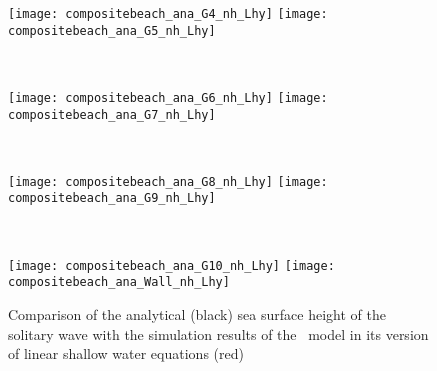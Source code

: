 \begin{figure}[htbp]
\begin{minipage}{\textwidth}
\texttt{[image: compositebeach\_ana\_G4\_nh\_Lhy]}
\texttt{[image: compositebeach\_ana\_G5\_nh\_Lhy]}
\end{minipage} \\
\begin{minipage}{\textwidth}
\texttt{[image: compositebeach\_ana\_G6\_nh\_Lhy]}
\texttt{[image: compositebeach\_ana\_G7\_nh\_Lhy]}
\end{minipage} \\
\begin{minipage}{\textwidth}
\texttt{[image: compositebeach\_ana\_G8\_nh\_Lhy]}
\texttt{[image: compositebeach\_ana\_G9\_nh\_Lhy]}
\end{minipage} \\
\begin{minipage}{\textwidth}
\texttt{[image: compositebeach\_ana\_G10\_nh\_Lhy]}
\texttt{[image: compositebeach\_ana\_Wall\_nh\_Lhy]}
\end{minipage}
\caption{Comparison of the analytical (black) sea surface height of the
solitary wave with the simulation results of the \nh\ model in its version of linear shallow water equations (red)}
\label{fig:nh_compositebeach_ana_nh_Lhy}
\end{figure}

